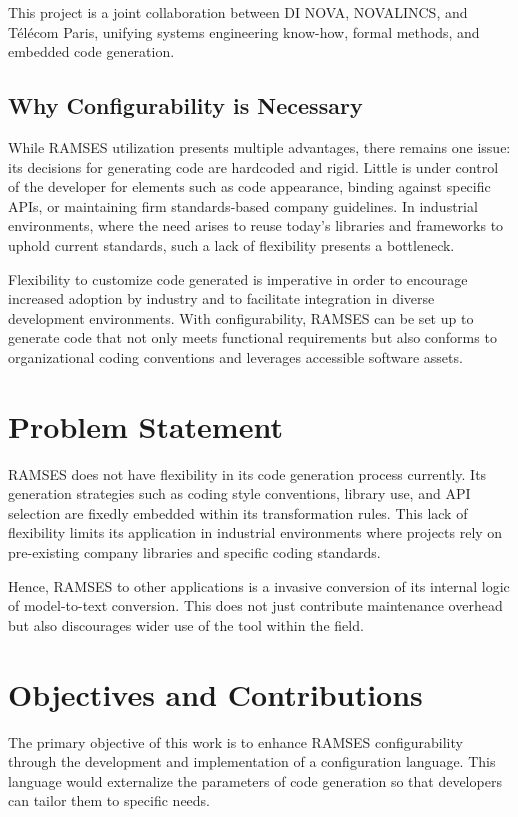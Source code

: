 This project is a joint collaboration between DI NOVA, NOVALINCS, and Télécom Paris, unifying systems engineering know-how, formal methods, and embedded code generation.


\subsection{Why Configurability is Necessary}

While RAMSES utilization presents multiple advantages, there remains one issue: its decisions for generating code are hardcoded and rigid. Little is under control of the developer for elements such as code appearance, binding against specific APIs, or maintaining firm standards-based company guidelines. In industrial environments, where the need arises to reuse today's libraries and frameworks to uphold current standards, such a lack of flexibility presents a bottleneck.
\par
Flexibility to customize code generated is imperative in order to encourage increased adoption by industry and to facilitate integration in diverse development environments. With configurability, RAMSES can be set up to generate code that not only meets functional requirements but also conforms to organizational coding conventions and leverages accessible software assets.

\section{Problem Statement}

RAMSES does not have flexibility in its code generation process currently. Its generation strategies such as coding style conventions, library use, and API selection are fixedly embedded within its transformation rules. This lack of flexibility limits its application in industrial environments where projects rely on pre-existing company libraries and specific coding standards.
\par
Hence, RAMSES to other applications is a invasive conversion of its internal logic of model-to-text conversion. This does not just contribute maintenance overhead but also discourages wider use of the tool within the field.


\section{Objectives and Contributions}

The primary objective of this work is to enhance RAMSES configurability through the development and implementation of a configuration language. This language would externalize the parameters of code generation so that developers can tailor them to specific needs.

